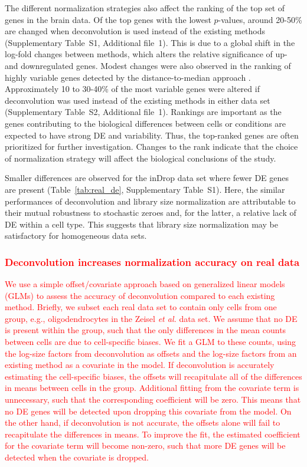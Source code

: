 \documentclass{bmcart}
\newcommand{\supprank}{S1}
\newcommand{\suppHVG}{S2}
\newcommand{\revised}[1]{\textcolor{red}{#1}}
\begin{document}
The different normalization strategies also affect the ranking of the top set of genes in the brain data.
Of the top genes with the lowest $p$-values, around 20-50\% are changed when deconvolution is used instead of the existing methods (Supplementary Table~\supprank{}, Additional file~1).
This is due to a global shift in the log-fold changes between methods, which alters the relative significance of up- and downregulated genes.
Modest changes were also observed in the ranking of highly variable genes detected by the distance-to-median approach \cite{kolod2015single}.
Approximately 10 to 30-40\% of the most variable genes were altered if deconvolution was used instead of the existing methods in either data set (Supplementary Table~\suppHVG{}, Additional file~1).
Rankings are important as the genes contributing to the biological differences between cells or conditions are expected to have strong DE and variability.
Thus, the top-ranked genes are often prioritized for further investigation.
Changes to the rank indicate that the choice of normalization strategy will affect the biological conclusions of the study.

Smaller differences are observed for the inDrop data set where fewer DE genes are present (Table~\ref{tab:real_de}, Supplementary Table~\supprank{}).
Here, the similar performances of deconvolution and library size normalization are attributable to their mutual robustness to stochastic zeroes and, for the latter, a relative lack of DE within a cell type.
This suggests that library size normalization may be satisfactory for homogeneous data sets.

\revised{\subsubsection*{Deconvolution increases normalization accuracy on real data}
We use a simple offset/covariate approach based on generalized linear models (GLMs) to assess the accuracy of deconvolution compared to each existing method.
Briefly, we subset each real data set to contain only cells from one group, e.g., oligodendrocytes in the Zeisel \emph{et al.} data set.
We assume that no DE is present within the group, such that the only differences in the mean counts between cells are due to cell-specific biases.
We fit a GLM to these counts, using the log-size factors from deconvolution as offsets and the log-size factors from an existing method as a covariate in the model.
If deconvolution is accurately estimating the cell-specific biases, the offsets will recapitulate all of the differences in means between cells in the group.
Additional fitting from the covariate term is unnecessary, such that the corresponding coefficient will be zero.
This means that no DE genes will be detected upon dropping this covariate from the model.
On the other hand, if deconvolution is not accurate, the offsets alone will fail to recapitulate the differences in means.
To improve the fit, the estimated coefficient for the covariate term will become non-zero, such that more DE genes will be detected when the covariate is dropped.}
\end{document}
